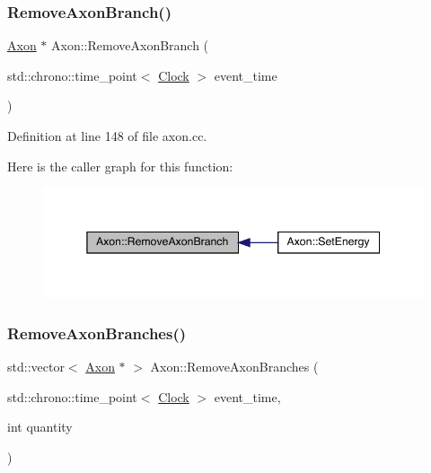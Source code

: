 \subsubsection{\texorpdfstring{Remove\+Axon\+Branch()}{RemoveAxonBranch()}}
{\footnotesize\ttfamily \hyperlink{class_axon}{Axon} $\ast$ Axon\+::\+Remove\+Axon\+Branch (\begin{DoxyParamCaption}\item[{std\+::chrono\+::time\+\_\+point$<$ \hyperlink{universe_8h_a0ef8d951d1ca5ab3cfaf7ab4c7a6fd80}{Clock} $>$}]{event\+\_\+time }\end{DoxyParamCaption})}



Definition at line 148 of file axon.\+cc.

Here is the caller graph for this function\+:
\nopagebreak
\begin{figure}[H]
\begin{center}
\leavevmode
\includegraphics[width=345pt]{class_axon_a7b43ca7f5b696c72ac17a27fea3b2822_icgraph}
\end{center}
\end{figure}
\mbox{\label{class_axon_a4c7af6c0900ae766c55362bfbb827ce3}} 
\subsubsection{\texorpdfstring{Remove\+Axon\+Branches()}{RemoveAxonBranches()}}
{\footnotesize\ttfamily std\+::vector$<$ \hyperlink{class_axon}{Axon} $\ast$ $>$ Axon\+::\+Remove\+Axon\+Branches (\begin{DoxyParamCaption}\item[{std\+::chrono\+::time\+\_\+point$<$ \hyperlink{universe_8h_a0ef8d951d1ca5ab3cfaf7ab4c7a6fd80}{Clock} $>$}]{event\+\_\+time,  }\item[{int}]{quantity }\end{DoxyParamCaption})}



